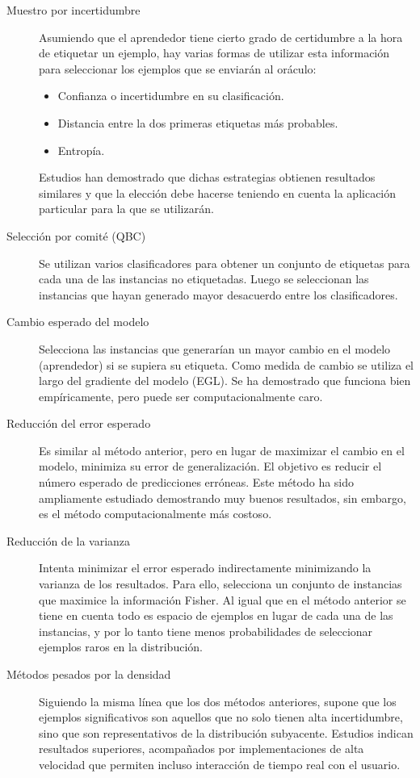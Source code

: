 \begin{description}
    \item[Muestro por incertidumbre] Asumiendo que el aprendedor tiene cierto
    grado de certidumbre a la hora de etiquetar un ejemplo, hay varias formas
    de utilizar esta información para seleccionar los ejemplos que se enviarán
    al oráculo:
    \begin{itemize}
        \item Confianza o incertidumbre en su clasificación.
        \item Distancia entre la dos primeras etiquetas más probables.
        \item Entropía.
    \end{itemize}
    Estudios han demostrado que dichas estrategias obtienen resultados similares
    y que la elección debe hacerse teniendo en cuenta la aplicación particular
    para la que se utilizarán.
    \item[Selección por comité (QBC)] Se utilizan varios clasificadores para obtener
    un conjunto de etiquetas para cada una de las instancias no etiquetadas.
    Luego se seleccionan las instancias que hayan generado mayor desacuerdo
    entre los clasificadores.
    \item[Cambio esperado del modelo] Selecciona las instancias que generarían
    un mayor cambio en el modelo (aprendedor) si se supiera su etiqueta. Como
    medida de cambio se utiliza el largo del gradiente del modelo (EGL). Se ha
    demostrado que funciona bien empíricamente, pero puede ser
    computacionalmente caro.
    \item[Reducción del error esperado] Es similar al método anterior, pero en
    lugar de maximizar el cambio en el modelo, minimiza su error de
    generalización. El objetivo es reducir el número esperado de predicciones
    erróneas. Este método ha sido ampliamente estudiado demostrando muy buenos
    resultados, sin embargo, es el método computacionalmente más costoso.
    \item[Reducción de la varianza] Intenta minimizar el error esperado
    indirectamente minimizando la varianza de los resultados. Para ello,
    selecciona un conjunto de instancias que maximice la información Fisher. Al
    igual que en el método anterior se tiene en cuenta todo es espacio de
    ejemplos en lugar de cada una de las instancias, y por lo tanto tiene menos
    probabilidades de seleccionar ejemplos raros en la distribución.
    \item[Métodos pesados por la densidad] Siguiendo la misma línea que los dos
    métodos anteriores, supone que los ejemplos significativos son aquellos
    que no solo tienen alta incertidumbre, sino que son representativos
    de la distribución subyacente. Estudios indican resultados superiores,
    acompañados por implementaciones de alta velocidad que permiten incluso
    interacción de tiempo real con el usuario.
\end{description}

